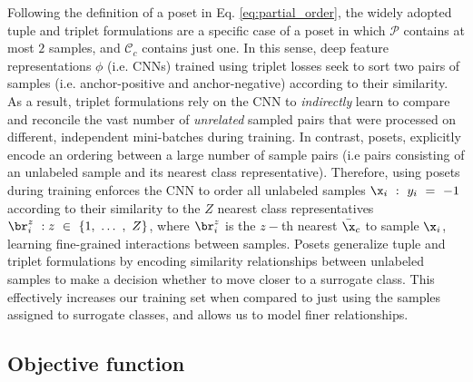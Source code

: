 \documentclass[10pt,twocolumn,letterpaper]{article}
\begin{document}
Following the definition of a poset in Eq. \ref{eq:partial_order}, the widely adopted tuple and triplet formulations \cite{ConvNetpretext1, ConvNetpretext2,shuffleandlearn,Yang_2016_CVPR} are a specific case of a poset in which $\mathcal{P}$ contains at most $2$ samples, and $\mathcal{C}_c$ contains just one. In this sense, deep feature representations $\phi$ (i.e. CNNs) trained using triplet losses seek to sort two pairs of samples (i.e. anchor-positive and anchor-negative) according to their similarity. As a result, triplet formulations rely on the CNN to \textit{indirectly} learn to compare and reconcile the vast number of \textit{unrelated} sampled pairs that were processed on different, independent mini-batches during training. In contrast, posets, explicitly encode an ordering between a large number of sample pairs (i.e pairs consisting of an unlabeled sample and its nearest class representative). Therefore, using posets during training enforces the CNN to order all unlabeled samples $\x_i~:~y_i~=~-1$ according to their similarity to the $Z$ nearest class representatives $\br^z_i~:z~\in~\{1,~\dots~,~Z\}$, where $\br^z_i$ is the $z-$th nearest $\bar{\x}_c$ to sample $\x_i$, learning fine-grained interactions between samples.  Posets generalize tuple and triplet formulations by encoding similarity relationships between unlabeled samples to make a decision whether to move closer to a surrogate class. This effectively increases our training set when compared to just using the samples assigned to surrogate classes, and allows us to model finer relationships.





\subsection{Objective function}
\end{document}
